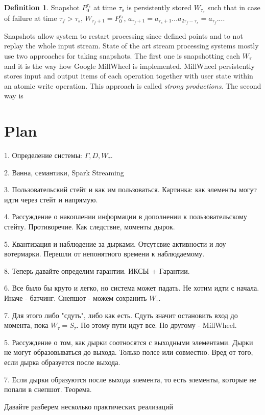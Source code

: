 \documentclass[sigconf]{acmart}
\theoremstyle{definition}
\newtheorem{definition}{Definition}
\begin{document}
\begin{definition}{Snapshot}
$P_0^{\tau_s}$ at time $\tau_s$ is persistently stored $W_{\tau_s}$ such that in case of failure at time $\tau_f>\tau_s$, $W_{\tau_f+1}=P_0^{\tau_s}$, $a_{\tau_f+1}=a_{\tau_s+1}...a_{2\tau_f-\tau_s}=a_{\tau_f}...$.
\end{definition}

Snapshots allow system to restart processing since defined points and to not replay the whole input stream. State of the art stream processing systems mostly use two approaches for taking snapshots. The first one is snapshotting each $W_\tau$ and it is the way how Google MillWheel is implemented. MillWheel persistently stores input and output items of each operation together with user state within an atomic write operation. This approach is called {\em strong productions}. The second way is 

\section{Plan}

1. Определение системы: $\Gamma,D,W_\tau$.

2. Ванна, семантики, Spark Streaming

3. Пользовательский стейт и как им пользоваться. Картинка: как элементы могут идти через стейт и напрямую.

4. Рассуждение о накоплении информации в дополнении к пользовательскому стейту. Противоречие. Как следствие, моменты дырок.

5. Квантизация и наблюдение за дырками. Отсутсвие активности и лоу вотермарки. Перешли от непонятного времени к наблюдаемому.

8. Теперь давайте определим гарантии. ИКСЫ + Гарантии.


6. Все было бы круто и легко, но система может падать. Не хотим идти с начала. Иначе - батчинг. Снепшот - можем сохранить $W_\tau$. 

7. Для этого либо "сдуть", либо как есть. Сдуть значит остановить вход до момента, пока $W_\tau=S_\tau$. По этому пути идут все. По другому -  MillWheel.

5. Рассуждение о том, как дырки соотносятся с выходными элементами. Дырки не могут образовываться до выхода. Только полсе или совместно. Вред от того, если дырка образуется после выхода.

7. Если дырки образуются после выхода элемента, то есть элементы, которые не попали в снепшот. Теорема. 

Давайте разберем несколько практических реализаций



\end{document}
